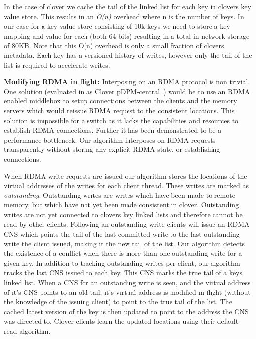 In the case of clover we cache the tail of the linked list for each
key in clovers key value store. This results in an \textit{O(n)}
overhead where n is the number of keys. In our case for a key value
store consisting of 10k keys we need to store a key mapping and value
for each (both 64 bits) resulting in a total in network storage of
80KB. Note that this O(n) overhead is only a small fraction of clovers
metadata. Each key has a versioned history of writes, however only the
tail of the list is required to accelerate writes.

\textbf{Modifying RDMA in flight:} Interposing on an RDMA protocol is non
trivial. One solution (evaluated in as Clover
pDPM-central~\cite{clover}) would be to use an RDMA enabled middlebox
to setup connections between the clients and the memory servers which
would reissue RDMA request to the consistent locations. This solution
is impossible for a switch as it lacks the capabilities and resources
to establish RDMA connections. Further it has been demonstrated to be
a performance bottleneck. Our algorithm interposes on RDMA requests
transparently without storing any explicit RDMA state, or establishing
connections.

When RDMA write requests are issued our algorithm stores the locations
of the virtual addresses of the writes for each client thread. These
writes are marked as \textit{outstanding}. Outstanding writes are
writes which have been made to remote memory, but which have not yet
been made consistent in clover. Outstanding writes are not yet
connected to clovers key linked lists and therefore cannot be read by
other clients. Following an outstanding write clients will issue an
RDMA CNS which points the tail of the last committed write to the last
outstanding write the client issued, making it the new tail of the
list. Our algorithm detects the existence of a conflict when there is
more than one outstanding write for a given key. In addition to
tracking outstanding writes per client, our algorithm tracks the last
CNS issued to each key. This CNS marks the true tail of a keys linked
list. When a CNS for an outstanding write is seen, and the virtual
address of it's CNS points to an old tail, it's virtual address is
modified in flight (without the knowledge of the issuing client) to
point to the true tail of the list. The cached latest version of the
key is then updated to point to the address the CNS was directed to.
Clover clients learn the updated locations using their default read
algorithm.

